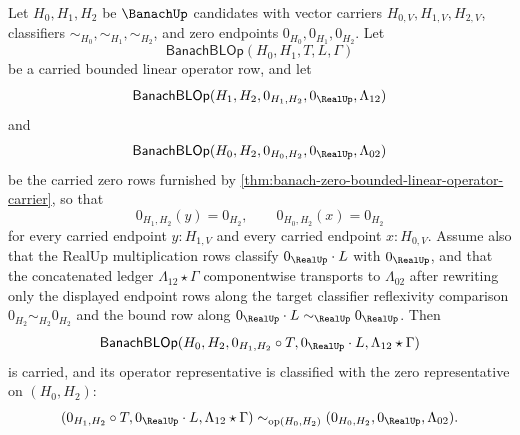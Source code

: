 \begin{theorem}
\label{thm:banach-bounded-linear-operator-zero-right-composition-annihilation}
Let $H_0,H_1,H_2$ be $\BanachUp$ candidates with vector carriers $H_{0,V},H_{1,V},H_{2,V}$, classifiers $\sim_{H_0},\sim_{H_1},\sim_{H_2}$, and zero endpoints $0_{H_0},0_{H_1},0_{H_2}$. Let
$$
\mathsf{BanachBLOp}(H_0,H_1,T,L,\Gamma)
$$
be a carried bounded linear operator row, and let
$$
\mathsf{BanachBLOp}(H_1,H_2,0_{H_1,H_2},0_{\RealUp},\Lambda_{12})
$$
and
$$
\mathsf{BanachBLOp}(H_0,H_2,0_{H_0,H_2},0_{\RealUp},\Lambda_{02})
$$
be the carried zero rows furnished by \autoref{thm:banach-zero-bounded-linear-operator-carrier}, so that
$$
0_{H_1,H_2}(y)=0_{H_2},
\qquad
0_{H_0,H_2}(x)=0_{H_2}
$$
for every carried endpoint $y:H_{1,V}$ and every carried endpoint $x:H_{0,V}$. Assume also that the RealUp multiplication rows classify $0_{\RealUp}\cdot L$ with $0_{\RealUp}$, and that the concatenated ledger $\Lambda_{12}\star\Gamma$ componentwise transports to $\Lambda_{02}$ after rewriting only the displayed endpoint rows along the target classifier reflexivity comparison $0_{H_2}\sim_{H_2}0_{H_2}$ and the bound row along $0_{\RealUp}\cdot L\sim_{\RealUp}0_{\RealUp}$. Then
$$
\mathsf{BanachBLOp}(H_0,H_2,0_{H_1,H_2}\circ T,0_{\RealUp}\cdot L,\Lambda_{12}\star\Gamma)
$$
is carried, and its operator representative is classified with the zero representative on $(H_0,H_2)$:
$$
(0_{H_1,H_2}\circ T,0_{\RealUp}\cdot L,\Lambda_{12}\star\Gamma)
\sim_{\mathrm{op}(H_0,H_2)}
(0_{H_0,H_2},0_{\RealUp},\Lambda_{02}).
$$
\end{theorem}
